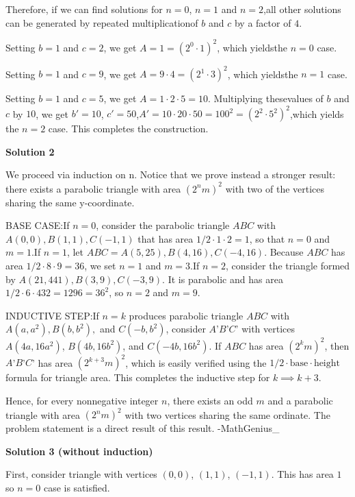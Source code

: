 \begin{enumerate}
 Therefore, if we can find solutions for $n = 0$, $n = 1$ and $n = 2$,all other solutions can be generated by repeated multiplicationof $b$ and $c$ by a factor of $4$.

 Setting $b=1$ and $c=2$, we get $A=1 = (2^0\cdot1)^2$, which yieldsthe $n=0$ case.

 Setting $b=1$ and $c=9$, we get $A = 9\cdot4 = (2^1\cdot3)^2$, which yieldsthe $n=1$ case.

 Setting $b=1$ and $c=5$, we get $A=1\cdot2\cdot5 = 10$. Multiplying thesevalues of $b$ and $c$ by $10$, we get $b'=10$, $c'=50$,$A'=10\cdot20\cdot50 = 100^2 = (2^2\cdot5^2)^2$,which yields the $n=2$ case. This completes the construction.

 



\textbf{Solution 2}

We proceed via induction on n. Notice that we prove instead a stronger result: there exists a parabolic triangle with area $(2^nm)^2$ with two of the vertices sharing the same y-coordinate.

 BASE CASE:If $n = 0$, consider the parabolic triangle $ABC$ with $A(0, 0), B(1, 1), C(-1, 1)$ that has area $1/2 \cdot 1 \cdot 2 = 1$, so that $n = 0$ and $m = 1$.If $n = 1$, let $ABC = A(5, 25), B(4, 16), C(-4, 16)$. Because $ABC$ has area $1/2 \cdot 8 \cdot 9 = 36$, we set $n = 1$ and $m = 3$.If $n = 2$, consider the triangle formed by $A(21, 441), B(3, 9), C(-3, 9)$. It is parabolic and has area $1/2 \cdot 6 \cdot 432 = 1296 = 36^2$, so $n = 2$ and $m = 9$.

 INDUCTIVE STEP:If $n = k$ produces parabolic triangle $ABC$ with $A(a, a^2), B(b, b^2),$ and $C(-b, b^2)$, consider $A$'$B$'$C$' with vertices $A(4a, 16a^2)$, $B(4b, 16b^2)$, and $C(-4b, 16b^2)$. If $ABC$ has area $(2^km)^2$, then $A$'$B$'$C$' has area $(2^{k+3}m)^2$, which is easily verified using the $1/2 \cdot\text{base} \cdot \text{height}$ formula for triangle area. This completes the inductive step for $k \implies k+3$.

 Hence, for every nonnegative integer $n$, there exists an odd $m$ and a parabolic triangle with area $(2^nm)^2$ with two vertices sharing the same ordinate. The problem statement is a direct result of this result.         -MathGenius\_

 



\textbf{Solution 3 (without induction)}

First, consider triangle with vertices $(0,0)$, $(1,1)$, $(-1,1)$. This has area $1$ so $n=0$ case is satisfied.


\end{enumerate}
